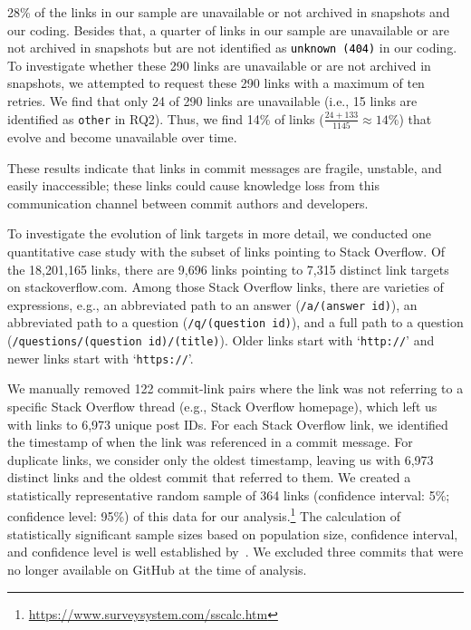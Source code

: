 \documentclass[smallextended]{svjour3}       %
\newcommand{\minor}[1]{\textcolor{black}{#1}}
\begin{document}
28\% of the links in our sample are unavailable or not archived in snapshots and our coding. Besides that, a quarter of links in our sample are unavailable or are not archived in snapshots but are not identified as \minor{\texttt{unknown (404)}} in our coding. To investigate whether these 290 links are unavailable or are not archived in snapshots, we attempted to request these 290 links with a maximum of ten retries. We find that only 24 of 290 links are unavailable (i.e., 15 links are identified as \texttt{other} in RQ2). Thus, we find 14\% of links ($\frac{24+133}{1145} \approx14\%$) that evolve and become unavailable over time.

These results indicate that links in commit messages are fragile, unstable, and easily inaccessible; these links could cause knowledge loss from this communication channel between commit authors and developers. 



To investigate the evolution of link targets in more detail, we conducted one quantitative case study with the subset of links pointing to Stack Overflow.
Of the 18,201,165 links, there are 9,696 links pointing to 7,315 distinct link targets on \textsf{stackoverflow.com}. Among those Stack Overflow links, there are varieties of expressions, e.g., an abbreviated path to an answer (\texttt{/a/(answer id)}), an abbreviated path to a question (\texttt{/q/(question id)}), and a full path to a question (\texttt{/questions/(question id)/(title)}). Older links start with `\texttt{http://}' and newer links start with `\texttt{https://}'.


We manually removed 122 commit-link pairs where the link was not referring to a specific Stack Overflow thread (e.g., Stack Overflow homepage), which left us with links to 6,973 unique post IDs. For each Stack Overflow link, we identified the timestamp of when the link was referenced in a commit message.
For duplicate links, we consider only the oldest timestamp, leaving us with 6,973 distinct links and the oldest commit that referred to them. We created a statistically representative random sample of 364 links (confidence interval: 5\%; confidence level: 95\%) of this data for our analysis.\footnote{\url{https://www.surveysystem.com/sscalc.htm}} The calculation of
statistically significant sample sizes based on population size,
confidence interval, and confidence level is well established by~\cite{krejcie1970determining}. We excluded three commits that were no longer available on GitHub at the time of analysis.
\end{document}
